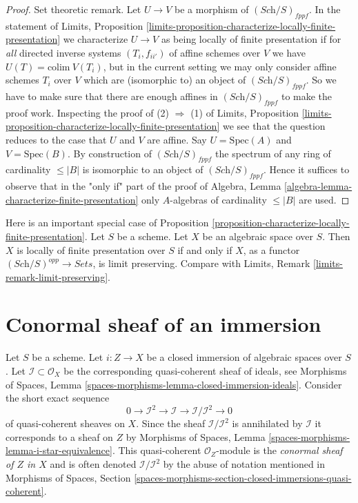 \begin{proof}
\medskip\noindent
Set theoretic remark. Let $U \to V$ be a morphism of
$(\textit{Sch}/S)_{fppf}$. In the statement of
Limits, Proposition
\ref{limits-proposition-characterize-locally-finite-presentation}
we characterize $U \to V$ as being locally of finite presentation
if for {\it all} directed inverse systems $(T_i, f_{ii'})$ of affine schemes
over $V$ we have $U(T) = \text{colim}\ V(T_i)$, but in the current setting
we may only consider affine schemes $T_i$ over $V$ which are (isomorphic to)
an object of $(\textit{Sch}/S)_{fppf}$. So we have to make sure that there
are enough affines in $(\textit{Sch}/S)_{fppf}$ to make the proof work.
Inspecting the proof of (2) $\Rightarrow$ (1) of
Limits, Proposition
\ref{limits-proposition-characterize-locally-finite-presentation}
we see that the question reduces to the case that $U$ and $V$ are affine.
Say $U = \text{Spec}(A)$ and $V = \text{Spec}(B)$. By construction
of $(\textit{Sch}/S)_{fppf}$ the spectrum of any ring of cardinality
$\leq |B|$ is isomorphic to an object of $(\textit{Sch}/S)_{fppf}$.
Hence it suffices to observe that in the "only if" part of the proof of
Algebra, Lemma \ref{algebra-lemma-characterize-finite-presentation}
only $A$-algebras of cardinality $\leq |B|$ are used.
\end{proof}

\begin{remark}
\label{remark-limit-preserving}
Here is an important special case of
Proposition \ref{proposition-characterize-locally-finite-presentation}.
Let $S$ be a scheme. Let $X$ be an algebraic space over $S$.
Then $X$ is locally of finite presentation over $S$ if and only
if $X$, as a functor $(\textit{Sch}/S)^{opp} \to \textit{Sets}$,
is limit preserving. Compare with
Limits, Remark \ref{limits-remark-limit-preserving}.
\end{remark}











\section{Conormal sheaf of an immersion}
\label{section-conormal-sheaf}

\noindent
Let $S$ be a scheme. Let $i : Z \to X$ be a closed immersion of algebraic
spaces over $S$. Let $\mathcal{I} \subset \mathcal{O}_X$ be the corresponding
quasi-coherent sheaf of ideals, see
Morphisms of Spaces,
Lemma \ref{spaces-morphisms-lemma-closed-immersion-ideals}.
Consider the short exact sequence
$$
0 \to \mathcal{I}^2 \to \mathcal{I} \to \mathcal{I}/\mathcal{I}^2 \to 0
$$
of quasi-coherent sheaves on $X$. Since the sheaf $\mathcal{I}/\mathcal{I}^2$
is annihilated by $\mathcal{I}$ it corresponds to a sheaf on $Z$ by
Morphisms of Spaces, Lemma \ref{spaces-morphisms-lemma-i-star-equivalence}.
This quasi-coherent $\mathcal{O}_Z$-module is the
{\it conormal sheaf of $Z$ in $X$} and is often denoted
$\mathcal{I}/\mathcal{I}^2$ by the abuse of notation mentioned in
Morphisms of Spaces,
Section \ref{spaces-morphisms-section-closed-immersions-quasi-coherent}.

